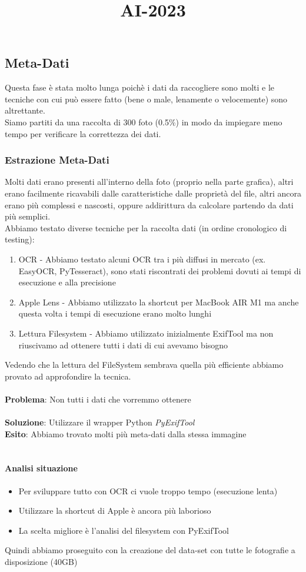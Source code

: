 \title{AI-2023}\documentclass[12pt,a4paper,twoside]{article}
\begin{document}
\subsection{Meta-Dati}
Questa fase è stata molto lunga poichè i dati da raccogliere sono molti e le tecniche con cui può essere fatto 
(bene o male, lenamente o velocemente) sono altrettante.\\
Siamo partiti da una raccolta di 300 foto (0.5\%) in modo da impiegare meno tempo per verificare la correttezza 
dei dati.

\subsubsection{Estrazione Meta-Dati}
Molti dati erano presenti all'interno della foto (proprio nella parte grafica), altri erano facilmente ricavabili 
dalle caratteristiche dalle proprietà del file, altri ancora erano più complessi e nascosti, oppure addirittura 
da calcolare partendo da dati più semplici.\\
Abbiamo testato diverse tecniche per la raccolta dati (in ordine cronologico di testing):
\begin{enumerate}
    \item OCR - Abbiamo testato alcuni OCR tra i più diffusi in mercato (ex. EasyOCR, PyTesseract), sono stati 
          riscontrati dei problemi dovuti ai tempi di esecuzione e alla precisione
    \item Apple Lens - Abbiamo utilizzato la shortcut per MacBook AIR M1 ma anche questa volta i tempi di 
          esecuzione erano molto lunghi
    \item Lettura Filesystem - Abbiamo utilizzato inizialmente ExifTool ma non riuscivamo ad ottenere tutti i 
          dati di cui avevamo bisogno
\end{enumerate}
Vedendo che la lettura del FileSystem sembrava quella più efficiente abbiamo provato ad approfondire la tecnica.
\\\\
\textbf{Problema}: Non tutti i dati che vorremmo ottenere\\
\\
\textbf{Soluzione}: Utilizzare il wrapper Python \textit{PyExifTool}\\
\textbf{Esito}: Abbiamo trovato molti più meta-dati dalla stessa immagine\\
\\

\paragraph{Analisi situazione}
\begin{itemize}
    \item Per sviluppare tutto con OCR ci vuole troppo tempo (esecuzione lenta)
    \item Utilizzare la shortcut di Apple è ancora più laborioso
    \item La scelta migliore è l'analisi del filesystem con PyExifTool
\end{itemize}
Quindi abbiamo proseguito con la creazione del data-set con tutte le fotografie a disposizione (40GB)
\end{document}
